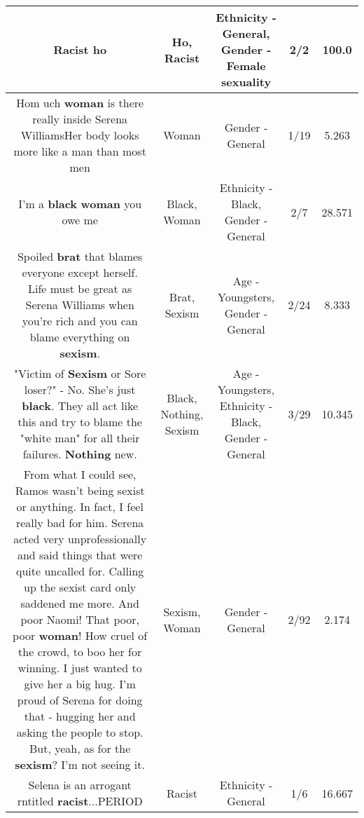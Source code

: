 \documentclass[11pt]{article}
\newlength\mylength
\begin{document}
\begin{center}
\begin{longtable}{|C{.65\mylength}|C{.30\mylength}|C{.12\mylength}|C{.12\mylength}|C{.12\mylength}|}
  \small Racist ho\normalsize   & Ho, Racist & Ethnicity - General, Gender - Female sexuality & 2/2 & 100.0 \\  \hline
  \small Hom uch \textbf{woman} is there really inside Serena WilliamsHer body looks more like a man than most men\normalsize   & Woman & Gender - General & 1/19 & 5.263 \\  \hline
  \small I'm a \textbf{black} \textbf{woman} you owe me\normalsize   & Black, Woman & Ethnicity - Black, Gender - General & 2/7 & 28.571 \\  \hline
  \small Spoiled \textbf{brat} that blames everyone except herself. Life must be great as Serena Williams when you're rich and you can blame everything on \textbf{sexism}.\normalsize   & Brat, Sexism & Age - Youngsters, Gender - General & 2/24 & 8.333 \\  \hline
  \small "Victim of \textbf{Sexism} or Sore loser?" - No. She's just \textbf{black}. They all act like this and try to blame the "white man" for all their failures. \textbf{Nothing} new.\normalsize   & Black, Nothing, Sexism & Age - Youngsters, Ethnicity - Black, Gender - General & 3/29 & 10.345 \\  \hline
  \small From what I could see, Ramos wasn't being sexist or anything. In fact, I feel really bad for him. Serena acted very unprofessionally and said things that were quite uncalled for. Calling up the sexist card only saddened me more. And poor Naomi! That poor, poor \textbf{woman}! How cruel of the crowd, to boo her for winning. I just wanted to give her a big hug. I'm proud of Serena for doing that - hugging her and asking the people to stop. But, yeah, as for the \textbf{sexism}? I'm not seeing it.\normalsize   & Sexism, Woman & Gender - General & 2/92 & 2.174 \\  \hline
  \small Selena is an arrogant rntitled \textbf{racist}...PERIOD\normalsize   & Racist & Ethnicity - General & 1/6 & 16.667 \\  \hline

\end{longtable}
\end{center}
\end{document}
